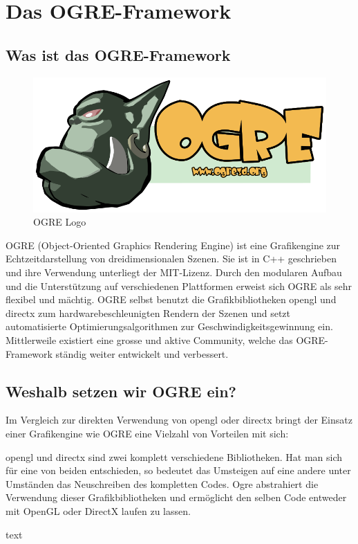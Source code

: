 \section{Das OGRE-Framework}

\subsection{Was ist das OGRE-Framework}

\begin{figure}
	\includegraphics[width=1\linewidth]{src/OgreLogo.png}
	\caption{OGRE Logo} %
	\label{OGRE Logo} %
\end{figure}

OGRE (Object-Oriented Graphics Rendering Engine) ist eine Grafikengine zur Echtzeitdarstellung von dreidimensionalen Szenen. Sie ist in C++ geschrieben und ihre Verwendung unterliegt der MIT-Lizenz. Durch den modularen Aufbau und die Unterstützung auf verschiedenen Plattformen erweist sich OGRE als sehr flexibel und mächtig. OGRE selbst benutzt die Grafikbibliotheken \gls{opengl} und \gls{directx} zum hardwarebeschleunigten Rendern der Szenen und setzt automatisierte Optimierungsalgorithmen zur Geschwindigkeitsgewinnung ein. Mittlerweile existiert eine grosse und aktive Community, welche das OGRE-Framework ständig weiter entwickelt und verbessert.

\subsection{Weshalb setzen wir OGRE ein?}

Im Vergleich zur direkten Verwendung von \gls{opengl} oder \gls{directx} bringt der Einsatz einer Grafikengine wie OGRE eine Vielzahl von Vorteilen mit sich:

 \gls{opengl} und \gls{directx} sind zwei komplett verschiedene Bibliotheken. Hat man sich für eine von beiden entschieden, so bedeutet das Umsteigen auf eine andere unter Umständen das Neuschreiben des kompletten Codes. Ogre abstrahiert die Verwendung dieser Grafikbibliotheken und ermöglicht den selben Code entweder mit OpenGL oder DirectX laufen zu lassen.

 text
